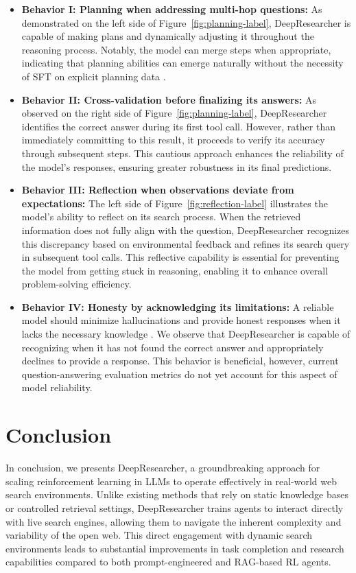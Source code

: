 \documentclass{article}
\newcommand{\scrl}{DeepResearcher\xspace}
\begin{document}
\begin{itemize}
\item \textbf{Behavior I: Planning when addressing multi-hop questions:} As demonstrated on the left side of Figure~\ref{fig:planning-label}, \scrl is capable of making plans and dynamically adjusting it throughout the reasoning process. Notably, the model can merge steps when appropriate, indicating that planning abilities can emerge naturally without the necessity of SFT on explicit planning data \cite{yue2024dots}.
\item \textbf{Behavior II: Cross-validation before finalizing its answers:} As observed on the right side of Figure~\ref{fig:planning-label}, \scrl identifies the correct answer during its first tool call. However, rather than immediately committing to this result, it proceeds to verify its accuracy through subsequent steps. This cautious approach enhances the reliability of the model's responses,  ensuring greater robustness in its final predictions.
\item \textbf{Behavior III: Reflection when observations deviate from expectations:} The left side of Figure~\ref{fig:reflection-label} illustrates the model's ability to reflect on its search process. When the retrieved information does not fully align with the question, \scrl recognizes this discrepancy based on environmental feedback and refines its search query in subsequent tool calls. This reflective capability is essential for preventing the model from getting stuck \cite{fu2025agentrefine} in reasoning, enabling it to enhance overall problem-solving efficiency.
\item \textbf{Behavior IV: Honesty by acknowledging its limitations:} A reliable model should minimize hallucinations and provide honest responses when it lacks the necessary knowledge \cite{yang2024alignment}. We observe that \scrl is capable of recognizing when it has not found the correct answer and appropriately declines to provide a response. This behavior is beneficial, however, current question-answering evaluation metrics do not yet account for this aspect of model reliability.
\end{itemize}

\section{Conclusion}
In conclusion, we presents \scrl, a groundbreaking approach for scaling reinforcement learning in LLMs to operate effectively in real-world web search environments. Unlike existing methods that rely on static knowledge bases or controlled retrieval settings, \scrl trains agents to interact directly with live search engines, allowing them to navigate the inherent complexity and variability of the open web. This direct engagement with dynamic search environments leads to substantial improvements in task completion and research capabilities compared to both prompt-engineered and RAG-based RL agents.
\end{document}
